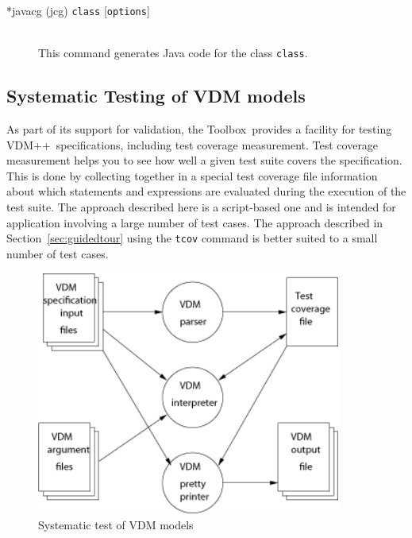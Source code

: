 \documentclass[\pformat,12pt]{article}
\newcommand{\vdmslpp}{VDM++}
\newcommand{\Toolbox}{Toolbox}
\begin{document}
\begin{description}
\item[*javacg (jcg) {\tt class} {[}{\tt options}{]}]   \mbox{}\\
  This command generates Java code for the class {\tt class}.
\end{description}

\newpage
\subsection{Systematic Testing of VDM models}\label{sec:testing}
\label{vdmtc} 

As part of its support for validation, the \Toolbox\ provides a
facility for testing \vdmslpp\ specifications, including test
  coverage measurement.  Test coverage measurement helps you to see
how well a given test suite covers the
specification. This is done by collecting together in a special 
test coverage file information  about which
statements and expressions are 
evaluated during the execution of the test suite. The approach
described here is a script-based one and is intended for application
involving a large number of test cases. The approach described in
Section~\ref{sec:guidedtour} using the \texttt{tcov} command is better
suited to a small number of test cases.


\begin{figure}[tbh]
\begin{center}
\includegraphics[width=10cm]{testenv.png}
\caption{Systematic test of VDM models}
\label{fig:testenv}
\end{center}
\end{figure}
\end{document}
